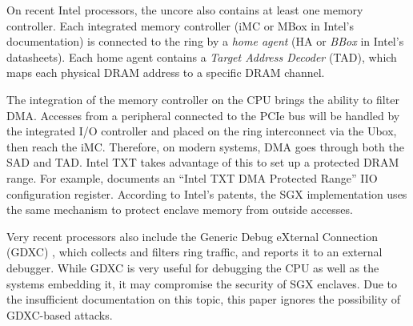 On recent Intel processors, the uncore also contains at least one memory
controller. Each integrated memory controller (iMC or MBox in Intel's
documentation) is connected to the ring by a \textit{home agent} (HA or
\textit{BBox} in Intel's datasheets). Each home agent contains a
\textit{Target Address Decoder} (TAD), which maps each physical DRAM address to
a specific DRAM channel.

The integration of the memory controller on the CPU brings the ability to
filter DMA. Accesses from a peripheral connected to the PCIe bus will be
handled by the integrated I/O controller and placed on the ring interconnect
via the Ubox, then reach the iMC. Therefore, on modern systems, DMA goes
through both the SAD and TAD. Intel TXT takes advantage of this to set up a
protected DRAM range. For example, \cite{intel2015datasheet} documents an
``Intel TXT DMA Protected Range'' IIO configuration register. According to
Intel's patents, the SGX implementation uses the same mechanism to protect
enclave memory from outside accesses.

Very recent processors also include the Generic Debug eXternal Connection
(GDXC) \cite{yuffe2011sandybridge, intel2011gdxc}, which collects and filters
ring traffic, and reports it to an external debugger. While GDXC is very useful
for debugging the CPU as well as the systems embedding it, it may compromise
the security of SGX enclaves. Due to the insufficient documentation on this
topic, this paper ignores the possibility of GDXC-based attacks.
